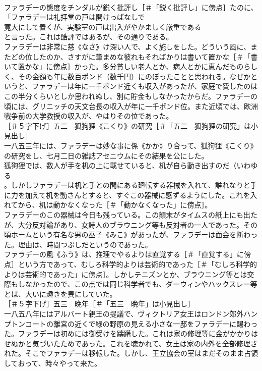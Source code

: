 \documentclass[8pt]{extreport}
\begin{document}
\begin{CJK}{UTF8}{min}
\\	ファラデーの態度をチンダルが鋭く批評し［＃「鋭く批評し」に傍点］たのに、「ファラデーは礼拝堂の戸は開けっぱなしで
\\	寛大にして置くが、実験室の戸は出入がやかましく厳重である
\\	と言った。これは酷評ではあるが、その通りである。
\\	ファラデーは非常に慈《なさ》け深い人で、よく施しをした。どういう風に、またどの位したのか、さすがに筆まめな彼れもそればかりは書いて置かな［＃「書いて置かな」に傍点］かった。多分貧しい老人とか、病人とかに恵んだものらしく、その金額も年に数百ポンド（数千円）にのぼったことと思われる。なぜかというと、ファラデーは年に一千ポンド近くも収入があったが、家庭で費したのはこの半分くらいとしか思われぬし、別に貯金もしなかったからだ。ファラデーの頃には、グリニッチの天文台長の収入が年に一千ポンド位。また近頃では、欧洲戦争前の大学教授の収入が、やはりその位であった。
\\	［＃５字下げ］五二　狐狗狸《こくり》の研究［＃「五二　狐狗狸の研究」は小見出し］
\\	一八五三年には、ファラデーは妙な事に係《かか》り合って、狐狗狸《こくり》の研究をし、七月二日の雑誌アセニウムにその結果を公にした。
\\	狐狗狸では、数人が手を机の上に載せていると、机が自ら動き出すのだ（いわゆる 
\\	。しかしファラデーは机と手との間にある廻転する器械を入れて、誰れなりと手に力を加えて机を動さんとすると、すぐこの器械に感ずるようにした。これを入れてから、机は動かなくなった［＃「動かなくなった」に傍点］。
\\	ファラデーのこの器械は今日も残っている。この顛末がタイムスの紙上にも出たが、大分反対論があり、女詩人のブラウニング等も反対者の一人であった。その頃ホームという有名な男の巫子《みこ》があったが、ファラデーは面会を断わった。理由は、時間つぶしだというのであった。
\\	ファラデーの風《ふう》は、推理でやるよりは直覚する［＃「直覚する」に傍点］という方であって、むしろ科学的よりは芸術的であった［＃「むしろ科学的よりは芸術的であった」に傍点］。しかしテニズンとか、ブラウニング等とは交際もしなかったので、この点では同じ科学者でも、ダーウィンやハックスレー等とは、大いに趣きを異にしていた。
\\	［＃５字下げ］五三　晩年［＃「五三　晩年」は小見出し］
\\	一八五八年にはアルバート親王の提議で、ヴィクトリア女王はロンドン郊外ハンプトンコートの離宮の近くで緑の野原の見える小さな一邸をファラデーに賜わった。ファラデーは初めには御受けを躊躇した。これは家の修理等に金がかかりはせぬかと気づいたためであった。これを聴かれて、女王は家の内外を全部修理された。そこでファラデーは移転した。しかし、王立協会の室はまだそのまま占領しておって、時々やって来た。

\end{CJK}
\end{document}
